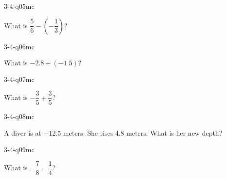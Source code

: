 \begin{practiceQuestion}{3-4-q05}{mc}
\begin{questionText}
What is $\dfrac{5}{6} - \left(-\dfrac{1}{3}\right)$?
\end{questionText}
\end{practiceQuestion}

\begin{practiceQuestion}{3-4-q06}{mc}
\begin{questionText}
What is $-2.8 + (-1.5)$?
\end{questionText}
\end{practiceQuestion}

\begin{practiceQuestion}{3-4-q07}{mc}
\begin{questionText}
What is $-\dfrac{3}{5} + \dfrac{3}{5}$?
\end{questionText}
\end{practiceQuestion}

\begin{practiceQuestion}{3-4-q08}{mc}
\begin{questionText}
A diver is at $-12.5$ meters. She rises $4.8$ meters. What is her new depth?
\end{questionText}
\end{practiceQuestion}

\begin{practiceQuestion}{3-4-q09}{mc}
\begin{questionText}
What is $-\dfrac{7}{8} - \dfrac{1}{4}$?
\end{questionText}
\end{practiceQuestion}

